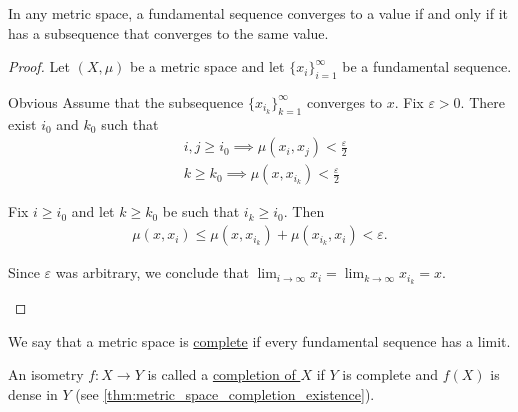 \begin{proposition}\label{thm:fundamental_subsequence_convergence}
  In any metric space, a fundamental sequence converges to a value if and only if it has a subsequence that converges to the same value.
\end{proposition}
\begin{proof}
  Let $(X, \mu)$ be a metric space and let $\{ x_i \}_{i=1}^\infty$ be a fundamental sequence.

  \begin{description}
    \Implies Obvious
    \ImpliedBy Assume that the subsequence $\{ x_{i_k} \}_{k=1}^\infty$ converges to $x$. Fix $\varepsilon > 0$. There exist $i_0$ and $k_0$ such that
    \begin{align*}
      &i, j \geq i_0 \implies \mu(x_i, x_j) < \tfrac \varepsilon 2 \\
      &k \geq k_0 \implies \mu(x, x_{i_k}) < \tfrac \varepsilon 2
    \end{align*}

    Fix $i \geq i_0$ and let $k \geq k_0$ be such that $i_k \geq i_0$. Then
    \begin{align*}
      \mu(x, x_i) \leq \mu(x, x_{i_k}) + \mu(x_{i_k}, x_i) < \varepsilon.
    \end{align*}

    Since $\varepsilon$ was arbitrary, we conclude that $\lim_{i \to \infty} x_i = \lim_{k \to \infty} x_{i_k} = x$.
  \end{description}
\end{proof}

\begin{definition}\label{def:complete_metric_space}
  We say that a metric space is \ul{complete} if every fundamental sequence has a limit.

  An isometry $f: X \to Y$ is called a \ul{completion of $X$} if $Y$ is complete and $f(X)$ is dense in $Y$ (see \cref{thm:metric_space_completion_existence}).
\end{definition}

